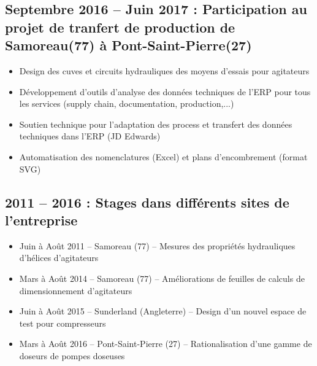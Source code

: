 \documentclass[10pt,a4paper,sans]{article}
\begin{document}
\begin{minipage}[t]{0.68\textwidth}
    \subsection{Septembre 2016 -- Juin 2017 : Participation au projet de tranfert de production de Samoreau(77) à Pont-Saint-Pierre(27)}
    \begin{itemize}
        \item{Design des cuves et circuits hydrauliques des moyens d’essais pour agitateurs}
        \item{Développement d’outils d’analyse des données techniques de l’ERP pour tous les services (supply chain, documentation, production,...)}
        \item{Soutien technique pour l’adaptation des process et transfert des données techniques dans l’ERP (JD Edwards)}
        \item{Automatisation des nomenclatures (Excel) et plans d’encombrement (format SVG)}
    \end{itemize}


    \subsection{2011 -- 2016 : Stages dans différents sites de l'entreprise}
    \begin{itemize}
        \item{Juin à Août 2011 – Samoreau (77) – Mesures des propriétés hydrauliques d’hélices d’agitateurs}
        \item{Mars à Août 2014 – Samoreau (77) – Améliorations de feuilles de calculs de dimensionnement d’agitateurs}
        \item{Juin à Août 2015 – Sunderland (Angleterre) – Design d’un nouvel espace de test pour compresseurs}
        \item{Mars à Août 2016 – Pont-Saint-Pierre (27) – Rationalisation d’une gamme de doseurs de pompes doseuses}
    \end{itemize}
\end{minipage}
\end{document}
